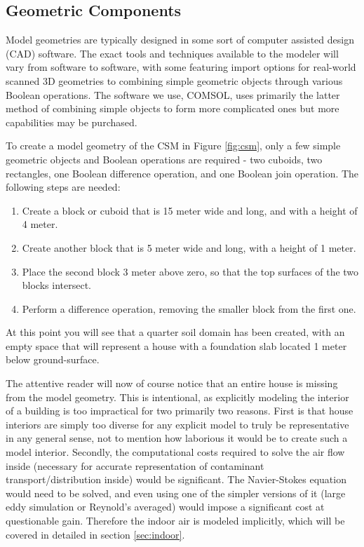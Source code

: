 \subsection{Geometric Components}

Model geometries are typically designed in some sort of computer assisted design (CAD) software.
The exact tools and techniques available to the modeler will vary from software to software, with some featuring import options for real-world scanned 3D geometries to combining simple geometric objects through various Boolean operations.
The software we use, COMSOL, uses primarily the latter method of combining simple objects to form more complicated ones but more capabilities may be purchased.\par

To create a model geometry of the CSM in Figure \ref{fig:csm}, only a few simple geometric objects and Boolean operations are required - two cuboids, two rectangles, one Boolean difference operation, and one Boolean join operation.
The following steps are needed:
\begin{enumerate}
  \item Create a block or cuboid that is 15 meter wide and long, and with a height of 4 meter.
  \item Create another block that is 5 meter wide and long, with a height of 1 meter.
  \item Place the second block 3 meter above zero, so that the top surfaces of the two blocks intersect.
  \item Perform a difference operation, removing the smaller block from the first one.
\end{enumerate}
At this point you will see that a quarter soil domain has been created, with an empty space that will represent a house with a foundation slab located 1 meter below ground-surface.\par

The attentive reader will now of course notice that an entire house is missing from the model geometry.
This is intentional, as explicitly modeling the interior of a building is too impractical for two primarily two reasons.
First is that house interiors are simply too diverse for any explicit model to truly be representative in any general sense, not to mention how laborious it would be to create such a model interior.
Secondly, the computational costs required to solve the air flow inside (necessary for accurate representation of contaminant transport/distribution inside) would be significant.
The Navier-Stokes equation would need to be solved, and even using one of the simpler versions of it (large eddy simulation or Reynold's averaged) would impose a significant cost at questionable gain.
Therefore the indoor air is modeled implicitly, which will be covered in detailed in section \ref{sec:indoor}.\par

